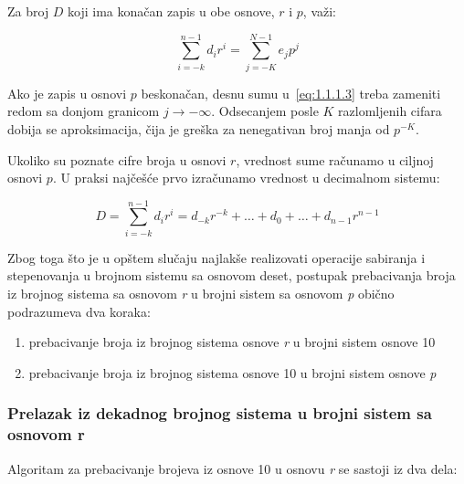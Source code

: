\documentclass[a4paper,11pt]{article}
\numberwithin{equation}{section}
\begin{document}
Za broj $D$ koji ima konačan zapis u obe osnove, $r$ i $p$, važi:



\begin{equation}\label{eq:1.1.1.3}
\sum_{i=-k}^{n-1}d_i r^i=\sum_{j=-K}^{N-1}e_j p^j
\end{equation}


Ako je zapis u osnovi $p$ beskonačan, desnu sumu u~\eqref{eq:1.1.1.3} treba zameniti redom sa donjom granicom $j\to-\infty$. Odsecanjem posle $K$ razlomljenih cifara dobija se aproksimacija, čija je greška za nenegativan broj manja od $p^{-K}$.

Ukoliko su poznate cifre broja u osnovi $r$, vrednost sume računamo u ciljnoj osnovi $p$. U praksi najčešće prvo izračunamo vrednost u decimalnom sistemu:



\begin{equation}\label{eq:1.1.1.4}
D=\sum_{i=-k}^{n-1}d_i r^i=d_{-k}r^{-k}+\dots+d_0+\dots+d_{n-1}r^{n-1}
\end{equation}


Zbog toga što je u opštem slučaju najlakše realizovati operacije sabiranja i stepenovanja u brojnom sistemu sa osnovom deset, postupak prebacivanja broja iz brojnog sistema sa osnovom \emph{r} u brojni sistem sa osnovom \emph{p} obično podrazumeva dva koraka:



\begin{enumerate}[label=\arabic*),start=1,leftmargin=*]
\item prebacivanje broja iz brojnog sistema osnove \emph{r} u brojni sistem osnove 10

\item prebacivanje broja iz brojnog sistema osnove 10 u brojni sistem osnove \emph{p}

\end{enumerate}


\subsubsection{Prelazak iz dekadnog brojnog sistema u brojni sistem sa osnovom r}\label{sec:1.1.2}


Algoritam za prebacivanje brojeva iz osnove 10 u osnovu \emph{r} se sastoji iz dva dela:
\end{document}
